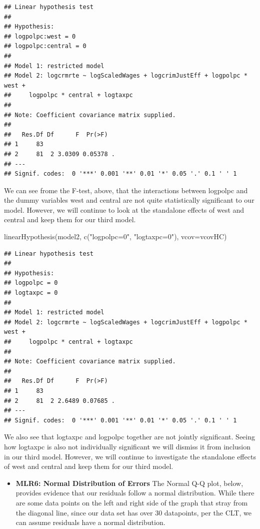 \documentclass[]{article}
\newenvironment{Shaded}{}{}
\newcommand{\DataTypeTok}[1]{#1}
\newcommand{\KeywordTok}[1]{\textcolor[rgb]{0.00,0.00,1.00}{#1}}
\newcommand{\NormalTok}[1]{#1}
\newcommand{\StringTok}[1]{\textcolor[rgb]{0.00,0.50,0.50}{#1}}
\providecommand{\tightlist}{%
  \setlength{\itemsep}{0pt}\setlength{\parskip}{0pt}}
\begin{document}
\begin{verbatim}
## Linear hypothesis test
## 
## Hypothesis:
## logpolpc:west = 0
## logpolpc:central = 0
## 
## Model 1: restricted model
## Model 2: logcrmrte ~ logScaledWages + logcrimJustEff + logpolpc * west + 
##     logpolpc * central + logtaxpc
## 
## Note: Coefficient covariance matrix supplied.
## 
##   Res.Df Df      F  Pr(>F)  
## 1     83                    
## 2     81  2 3.0309 0.05378 .
## ---
## Signif. codes:  0 '***' 0.001 '**' 0.01 '*' 0.05 '.' 0.1 ' ' 1
\end{verbatim}

We can see frome the F-test, above, that the interactions between
logpolpc and the dummy variables west and central are not quite
statistically significant to our model. However, we will continue to
look at the standalone effects of west and central and keep them for our
third model.

\begin{Shaded}
\begin{Highlighting}[]
\KeywordTok{linearHypothesis}\NormalTok{(model2, }\KeywordTok{c}\NormalTok{(}\StringTok{"logpolpc=0"}\NormalTok{, }\StringTok{"logtaxpc=0"}\NormalTok{), }\DataTypeTok{vcov=}\NormalTok{vcovHC)}
\end{Highlighting}
\end{Shaded}

\begin{verbatim}
## Linear hypothesis test
## 
## Hypothesis:
## logpolpc = 0
## logtaxpc = 0
## 
## Model 1: restricted model
## Model 2: logcrmrte ~ logScaledWages + logcrimJustEff + logpolpc * west + 
##     logpolpc * central + logtaxpc
## 
## Note: Coefficient covariance matrix supplied.
## 
##   Res.Df Df      F  Pr(>F)  
## 1     83                    
## 2     81  2 2.6489 0.07685 .
## ---
## Signif. codes:  0 '***' 0.001 '**' 0.01 '*' 0.05 '.' 0.1 ' ' 1
\end{verbatim}

We also see that logtaxpc and logpolpc together are not jointly
significant. Seeing how logtaxpc is also not individually significant we
will dismiss it from inclusion in our third model. However, we will
continue to investigate the standalone effects of west and central and
keep them for our third model.

\begin{itemize}
\tightlist
\item
  \textbf{MLR6: Normal Distribution of Errors} The Normal Q-Q plot,
  below, provides evidence that our residuals follow a normal
  distribution. While there are some data points on the left and right
  side of the graph that stray from the diagonal line, since our data
  set has over 30 datapoints, per the CLT, we can assume residuals have
  a normal distribution.
\end{itemize}
\end{document}
